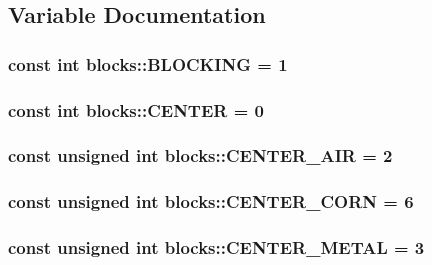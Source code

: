 \subsection{Variable Documentation}
\hypertarget{namespaceblocks_a12de5833d1f76be099d7371038e239cd}{
\subsubsection[{B\-L\-O\-C\-K\-I\-N\-G}]{\setlength{\rightskip}{0pt plus 5cm}const int blocks\-::\-B\-L\-O\-C\-K\-I\-N\-G = 1}}\label{namespaceblocks_a12de5833d1f76be099d7371038e239cd}
\hypertarget{namespaceblocks_a293bbaa7ca5f1014dc69c2caaa414095}{
\subsubsection[{C\-E\-N\-T\-E\-R}]{\setlength{\rightskip}{0pt plus 5cm}const int blocks\-::\-C\-E\-N\-T\-E\-R = 0}}\label{namespaceblocks_a293bbaa7ca5f1014dc69c2caaa414095}
\hypertarget{namespaceblocks_a3327185e4957b8756fcd8b0aeae2cbcb}{
\subsubsection[{C\-E\-N\-T\-E\-R\-\_\-\-A\-I\-R}]{\setlength{\rightskip}{0pt plus 5cm}const unsigned int blocks\-::\-C\-E\-N\-T\-E\-R\-\_\-\-A\-I\-R = 2}}\label{namespaceblocks_a3327185e4957b8756fcd8b0aeae2cbcb}
\hypertarget{namespaceblocks_a447728bb17162a7d87ed06d4db11060a}{
\subsubsection[{C\-E\-N\-T\-E\-R\-\_\-\-C\-O\-R\-N}]{\setlength{\rightskip}{0pt plus 5cm}const unsigned int blocks\-::\-C\-E\-N\-T\-E\-R\-\_\-\-C\-O\-R\-N = 6}}\label{namespaceblocks_a447728bb17162a7d87ed06d4db11060a}
\hypertarget{namespaceblocks_a32435f4674386fdba12f33155aea4310}{
\subsubsection[{C\-E\-N\-T\-E\-R\-\_\-\-M\-E\-T\-A\-L}]{\setlength{\rightskip}{0pt plus 5cm}const unsigned int blocks\-::\-C\-E\-N\-T\-E\-R\-\_\-\-M\-E\-T\-A\-L = 3}}\label{namespaceblocks_a32435f4674386fdba12f33155aea4310}
